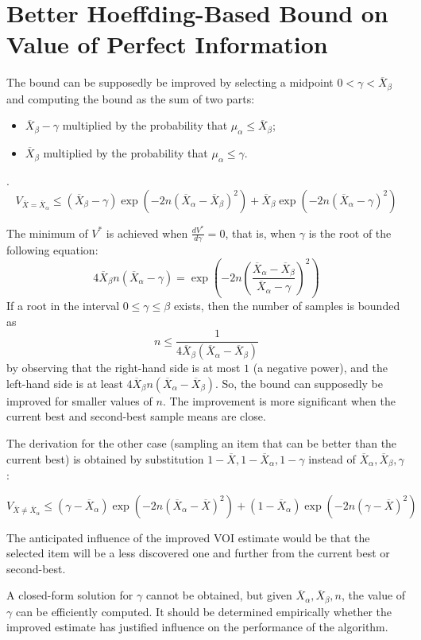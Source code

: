 \documentclass{article}
\begin{document}
\section{Better Hoeffding-Based Bound on Value of Perfect Information}
\label{app:better-hoeffding-bound}

The bound can be supposedly be improved by selecting a midpoint
$0 < \gamma < \overline X_\beta$ and computing the bound as the sum of two parts:
\begin{itemize}
\item $\overline X_\beta-\gamma$ multiplied by the probability that
  $\mu_\alpha \le \overline X_\beta$;
\item $\overline X_\beta$ multiplied by the probability that $\mu_\alpha\le
  \gamma$.
\end{itemize}.
\[ V_{\overline X=\overline X_\alpha} \le (\overline X_\beta-\gamma)\exp\left(-2n(\overline X_\alpha-\overline X_\beta)^2\right)+\overline X_\beta\exp\left(-2n(\overline X_\alpha-\gamma)^2\right) \]

\vspace{\baselineskip}

The minimum of $V^*$ is achieved when $\frac {dV^*} {d\gamma}=0$, that
is, when $\gamma$ is the root of the following equation:
\[ 4\overline X_\beta n(\overline X_\alpha-\gamma)=\exp\left(-2n\left(\frac {\overline X_\alpha-\overline X_\beta}
    {\overline X_\alpha-\gamma}\right)^2\right) \]
If a root in the interval  $0\le\gamma\le\beta$ exists, then the
number of samples is bounded as
\[n\le\frac 1 {4\overline X_\beta(\overline X_\alpha-\overline X_\beta)}\]
by observing that the right-hand side 
is at most $1$ (a negative power), and the left-hand side is at least
$4\overline X_\beta n(\overline X_\alpha-\overline X_\beta)$.
So, the bound can supposedly be improved for smaller values of
$n$. The improvement is more significant when the current best and
second-best sample means are close.

The derivation for the other case
(sampling an item that can be better than the current best) is
obtained by substitution $1-\overline X, 1-\overline X_\alpha, 1-\gamma$ instead of
$\overline X_\alpha, \overline X_\beta, \gamma$:

\[ V_{\overline X\ne\overline X_\alpha} \le (\gamma-\overline X_\alpha)\exp\left(-2n(\overline X_\alpha-\overline
  X)^2\right)+(1-\overline X_\alpha)\exp\left(-2n(\gamma-\overline X)^2\right) \]

The anticipated influence of the improved
VOI estimate would be that the selected item will be a less discovered
one and further from the current best or second-best.

A closed-form solution for $\gamma$ cannot be obtained, but given
$\overline X_\alpha, \overline X_\beta, n$, the value of $\gamma$ can be efficiently
computed. It should be determined empirically whether the improved
estimate has justified influence on the performance of the algorithm.



\end{document}
